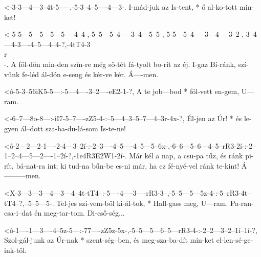

  {<-3-3---4---3--4t-5-----,-5-3--4--5----4---3-.}
  {  I-mád-juk az Is-tent, * ő al-ko-tott min-ket!}


  {<-5-5---5---5---5---5----4--4-,-5--5---5--4-----3--4---5--5-,-5-5---5--4-----3---4----3--2-,-3--4---4-3----4--5---4--4-?,-4tT4-3\\r\\-.}
  {  A föl-dön min-den szín-re még sö-tét fá-tyolt bo-rít az éj. I-gaz Bí-ránk, szí-vünk fe-léd ál-dón e-seng és kér-ve kér. Á----men.}

  {<ô-5-3--56iK5-5---:-5---4----3--2----eE2-1-?,}
  {   A te job---bod * föl-vett en-gem, U---ram.}

  {<-6--7---8o-8---:-iI7-5--7----zZ5-4-:--5---4--3--5--7---4--3r-4x-?,}
  {  Él-jen az Úr! * és  le-gyen ál--dott sza-ba-du-lá-som Is-te-ne!}


  {<ô-2---2---2-1----2-4---3--2í-:-2--3----4--5----4--5---5--6x-,-6--6---5--6---4--5--rR3-2í-:-2--1--2--4---5---2----1--2í-?,-1e4R3E2W1-2í-.}
  {   Már kél a nap, a csu-pa tűz, és ránk pi-rít, bá-nat-ra int; ki tud-na bűn-be es-ni  már, ha ez fé-nyé-vel ránk te-kint! Á---------men.}

  {<X-3---3---3---4---3---4--4t-tT4--:-5----4----3----rR3-3--,-5--5---5---5z-4-:-5--rR3-4t--tT4--?,--5--5---5-.}
  {   Tel-jes szí-vem-ből ki-ál-tok, * Hall-gass meg, U---ram. Pa-ran-csa-i--dat én meg-tar-tom. Di-cső-ség...}

  {<ô-1----1---3----4--5z-5---:-77----zZ5z-5x-,-5--5---5---6--5---rR3-4-:-2--2---3--2--1í--1í-?,}
  {   Szol-gál-junk az Úr-nak * szent-ség--ben, és meg-sza-ba-dít min-ket el-len-sé-ge-ink-től.}


